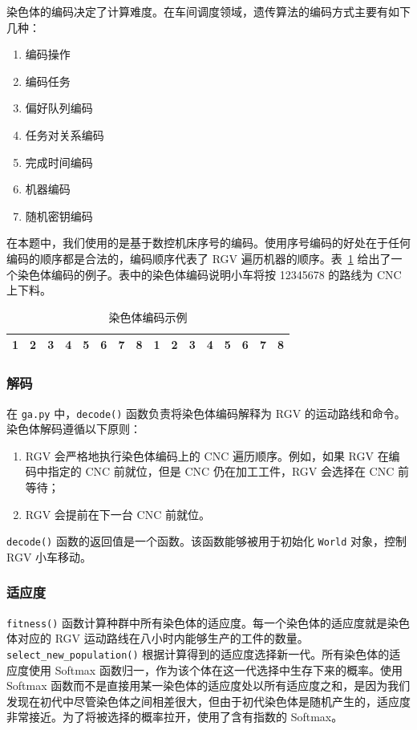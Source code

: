 \documentclass{cumcmthesis}
\begin{document}
	染色体的编码决定了计算难度。在车间调度领域，遗传算法的编码方式主要有如下几种：
	\begin{enumerate}
		\item 编码操作
		\item 编码任务
		\item 偏好队列编码
		\item 任务对关系编码
		\item 完成时间编码
		\item 机器编码
		\item 随机密钥编码
	\end{enumerate}
	在本题中，我们使用的是基于数控机床序号的编码。使用序号编码的好处在于任何编码的顺序都是合法的，编码顺序代表了 RGV 遍历机器的顺序。表~\ref{table:chromosome} 给出了一个染色体编码的例子。表中的染色体编码说明小车将按 12345678 的路线为 CNC 上下料。
	
	\begin{table}[!htbp]
		\centering
		\caption{染色体编码示例}
		\label{table:chromosome}
		\begin{tabular}{cccccccccccccccc}
	\toprule[1.5pt]
            1 & 2 & 3 & 4 & 5 & 6 & 7 & 8 & 1 & 2 & 3 & 4 & 5 & 6 & 7 & 8 \\
	\bottomrule[1.5pt]
	\end{tabular}
	\end{table}
	
	\subsubsection{解码}

	在 \texttt{ga.py} 中，\texttt{decode()} 函数负责将染色体编码解释为 RGV 的运动路线和命令。染色体解码遵循以下原则：
	\begin{enumerate}
		\item RGV 会严格地执行染色体编码上的 CNC 遍历顺序。例如，如果 RGV 在编码中指定的 CNC 前就位，但是 CNC 仍在加工工件，RGV 会选择在 CNC 前等待；
		\item RGV 会提前在下一台 CNC 前就位。
	\end{enumerate}
	\texttt{decode()} 函数的返回值是一个函数。该函数能够被用于初始化 \texttt{World} 对象，控制 RGV 小车移动。

	\subsubsection{适应度}

	\texttt{fitness()} 函数计算种群中所有染色体的适应度。每一个染色体的适应度就是染色体对应的 RGV 运动路线在八小时内能够生产的工件的数量。\texttt{select\_new\_population()} 根据计算得到的适应度选择新一代。所有染色体的适应度使用 Softmax 函数归一，作为该个体在这一代选择中生存下来的概率。使用 Softmax 函数而不是直接用某一染色体的适应度处以所有适应度之和，是因为我们发现在初代中尽管染色体之间相差很大，但由于初代染色体是随机产生的，适应度非常接近。为了将被选择的概率拉开，使用了含有指数的 Softmax。
\end{document}
